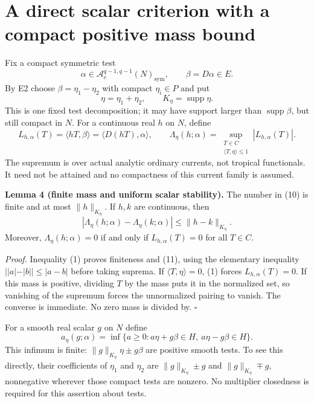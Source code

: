 \documentclass[
  11pt,
]{article}
\begin{document}
\section{A direct scalar criterion with a compact positive mass
bound}\label{a-direct-scalar-criterion-with-a-compact-positive-mass-bound}

Fix a compact symmetric test
\[\alpha\in\mathcal A_c^{q-1,q-1}(N)_{\mathrm{sym}},\qquad \beta=D\alpha\in E.\]
By E2 choose \(\beta=\eta_1-\eta_2\) with compact \(\eta_i\in P\) and
put \[\eta=\eta_1+\eta_2,\qquad K_\eta=\operatorname{supp}\eta.\] This
is one fixed test decomposition; it may have support larger than
\(\operatorname{supp}\beta\), but still compact in \(N\). For a
continuous real \(h\) on \(N\), define \[
 L_{h,\alpha}(T)=\langle hT,\beta\rangle=\langle D(hT),\alpha\rangle,
\qquad
 \Lambda_\eta(h;\alpha)=
 \sup_{\substack{T\in C\\\langle T,\eta\rangle\leq1}}
                         |L_{h,\alpha}(T)|.                 \tag{10}
\] The supremum is over actual analytic ordinary currents, not tropical
functionals. It need not be attained and no compactness of this current
family is assumed.

\textbf{Lemma 4 (finite mass and uniform scalar stability).} The number
in (10) is finite and at most \(\|h\|_{K_\eta}\). If \(h,k\) are
continuous, then \[|\Lambda_\eta(h;\alpha)-\Lambda_\eta(k;\alpha)|
                                         \leq\|h-k\|_{K_\eta}. \tag{11}\]
Moreover, \(\Lambda_\eta(h;\alpha)=0\) if and only if
\(L_{h,\alpha}(T)=0\) for all \(T\in C\).

\emph{Proof.} Inequality (1) proves finiteness and (11), using the
elementary inequality \(||a|-|b||\leq|a-b|\) before taking suprema. If
\(\langle T,\eta\rangle=0\), (1) forces \(L_{h,\alpha}(T)=0\). If this
mass is positive, dividing \(T\) by the mass puts it in the normalized
set, so vanishing of the supremum forces the unnormalized pairing to
vanish. The converse is immediate. No zero mass is divided by.
\(\square\)

For a smooth real scalar \(g\) on \(N\) define \[
 a_\eta(g;\alpha)=\inf\{a\geq0:
                    a\eta+g\beta\in H,\ a\eta-g\beta\in H\}. \tag{12}
\] This infimum is finite: \(\|g\|_{K_\eta}\eta\pm g\beta\) are positive
smooth tests. To see this directly, their coefficients of \(\eta_1\) and
\(\eta_2\) are \(\|g\|_{K_\eta}\pm g\) and \(\|g\|_{K_\eta}\mp g\),
nonnegative wherever those compact tests are nonzero. No multiplier
closedness is required for this assertion about tests.
\end{document}
